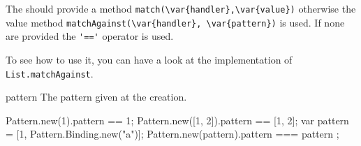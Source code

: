 \begin{urbiscriptapi}
  The  should provide a method
  \lstinline|match(\var{handler},\var{value})| otherwise the value method
  \lstinline|matchAgainst(\var{handler}, \var{pattern})| is used.  If none
  are provided the \lstinline|'=='| operator is used.

  To see how to use it, you can have a look at the implementation of
  \lstinline|List.matchAgainst|.



\item[pattern]
  The pattern given at the creation.
\begin{urbiassert}
Pattern.new(1).pattern == 1;
Pattern.new([1, 2]).pattern == [1, 2];
{
  var pattern = [1, Pattern.Binding.new("a")];
  Pattern.new(pattern).pattern === pattern
};
\end{urbiassert}

\end{urbiscriptapi}

